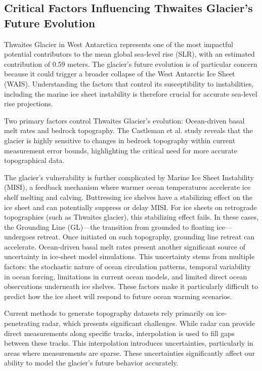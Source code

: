 \subsection*{Critical Factors Influencing Thwaites Glacier's Future Evolution}

Thwaites Glacier in West Antarctica represents one of the most impactful potential contributors to the mean global sea-level rise (SLR), with an estimated contribution of 0.59 meters\cite{Holt_2006}. The glacier's future evolution is of particular concern because it could trigger a broader collapse of the West Antarctic Ice Sheet (WAIS)\cite{Holt_2006, Castleman_2022}. Understanding the factors that control its susceptibility to instabilities, including the marine ice sheet instability is therefore crucial for accurate sea-level rise projections\cite{Castleman_2022}.

Two primary factors control Thwaites Glacier's evolution: Ocean-driven basal melt rates and bedrock topography\cite{Castleman_2022}. The Castleman et al.\cite{Castleman_2022} study reveals that the glacier is highly sensitive to changes in bedrock topography within current measurement error bounds, highlighting the critical need for more accurate topographical data.

The glacier's vulnerability is further complicated by Marine Ice Sheet Instability (MISI)\cite{Castleman_2022}, a feedback mechanism where warmer ocean temperatures accelerate ice shelf melting and calving. Buttressing ice shelves have a stabilizing effect on the ice sheet and can potentially suppress or delay MISI\cite{Werneke_2021}. For ice sheets on retrograde topographies (such as Thwaites glacier), this stabilizing effect fails. In these cases, the Grounding Line (GL)—the transition from grounded to floating ice—undergoes retreat. Once initiated on such topography, grounding line retreat can accelerate\cite{Castleman_2022}.
Ocean-driven basal melt rates present another significant source of uncertainty in ice-sheet model simulations. This uncertainty stems from multiple factors\cite{Castleman_2022}: the stochastic nature of ocean circulation patterns, temporal variability in ocean forcing, limitations in current ocean models, and limited direct ocean observations underneath ice shelves. These factors make it particularly difficult to predict how the ice sheet will respond to future ocean warming scenarios\cite{Castleman_2022}.

Current methods to generate topography datasets rely primarily on ice-penetrating radar, which presents significant challenges. While radar can provide direct measurements along specific tracks, interpolation is used to fill gaps between these tracks. This interpolation introduces uncertainties, particularly in areas where measurements are sparse. These uncertainties significantly affect our ability to model the glacier's future behavior accurately.

